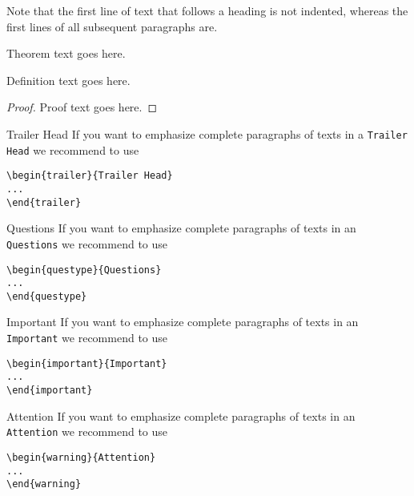 Note that the first line of text that follows a heading is not indented, whereas the first lines of all subsequent paragraphs are.
%
%
\begin{theorem}
Theorem text goes here.
\end{theorem}
%
\begin{definition}
Definition text goes here.
\end{definition}
%
\begin{proof}
Proof text goes here.
\end{proof}
%
%
\begin{trailer}{Trailer Head}
If you want to emphasize complete paragraphs of texts in a \verb|Trailer Head| we recommend to
use  \begin{verbatim}\begin{trailer}{Trailer Head}
...
\end{trailer}\end{verbatim}
\end{trailer}
%
\begin{questype}{Questions}
If you want to emphasize complete paragraphs of texts in an \verb|Questions| we recommend to
use  \begin{verbatim}\begin{questype}{Questions}
...
\end{questype}\end{verbatim}
\end{questype}
%
%
\begin{important}{Important}
If you want to emphasize complete paragraphs of texts in an \verb|Important| we recommend to
use  \begin{verbatim}\begin{important}{Important}
...
\end{important}\end{verbatim}
\end{important}
%
\clearpage
\begin{warning}{Attention}
If you want to emphasize complete paragraphs of texts in an \verb|Attention| we recommend to
use  \begin{verbatim}\begin{warning}{Attention}
...
\end{warning}\end{verbatim}
\end{warning}

